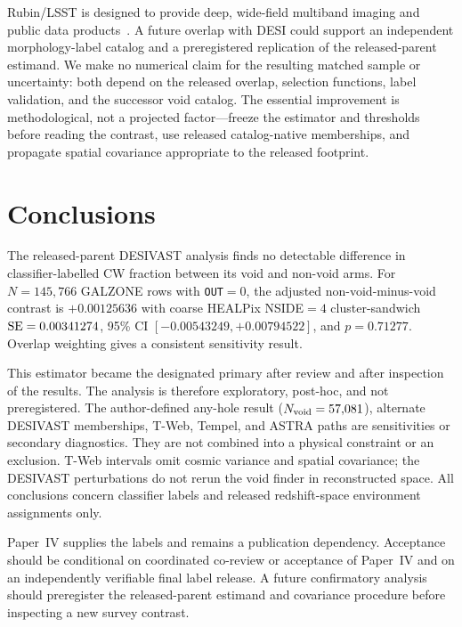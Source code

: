 \documentclass[aps,prd,twocolumn,superscriptaddress,showpacs,preprintnumbers,nofootinbib,longbibliography,floatfix]{revtex4-2}
\begin{document}
Rubin/LSST is designed to provide deep, wide-field multiband imaging and
public data products~\cite{Ivezic2019}. A future overlap with DESI could
support an independent morphology-label catalog and a preregistered
replication of the released-parent estimand. We make no numerical claim
for the resulting matched sample or uncertainty: both depend on the
released overlap, selection functions, label validation, and the
successor void catalog. The essential improvement is methodological, not
a projected factor---freeze the estimator and thresholds before reading
the contrast, use released catalog-native memberships, and propagate
spatial covariance appropriate to the released footprint.

\section{Conclusions}\label{sec:conclusions}

The released-parent DESIVAST analysis finds no detectable difference in
classifier-labelled CW fraction between its void and non-void arms. For
$N=145{,}766$ GALZONE rows with \texttt{OUT}$=0$, the adjusted
non-void-minus-void contrast is $+0.00125636$ with coarse HEALPix
NSIDE$=4$ cluster-sandwich ${\rm SE}=0.00341274$, 95\% CI
$[-0.00543249,+0.00794522]$, and $p=0.71277$. Overlap weighting gives a
consistent sensitivity result.

This estimator became the designated primary after review and after
inspection of the results. The analysis is therefore exploratory,
post-hoc, and not preregistered. The author-defined any-hole result
($N_{\rm void}=57{,}081$), alternate DESIVAST memberships, T-Web,
Tempel, and ASTRA paths are sensitivities or secondary diagnostics.
They are not combined into a physical constraint or an exclusion.
T-Web intervals omit cosmic variance and spatial covariance; the
DESIVAST perturbations do not rerun the void finder in reconstructed
space. All conclusions concern classifier labels and released
redshift-space environment assignments only.

Paper~IV supplies the labels and remains a publication dependency.
Acceptance should be conditional on coordinated co-review or acceptance
of Paper~IV and on an independently verifiable final label release. A
future confirmatory analysis should preregister the released-parent
estimand and covariance procedure before inspecting a new survey
contrast.
\end{document}
